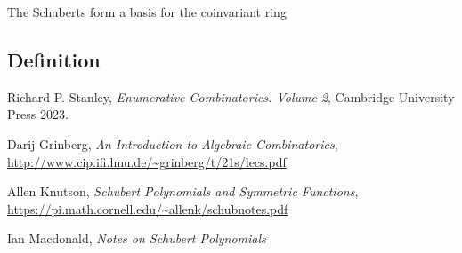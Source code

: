 \documentclass{article}
\begin{document}
\begin{theorem}
    The Schuberts form a basis for the coinvariant ring 
\end{theorem}
\subsection{Definition}



\begin{thebibliography}{999999999}
    \footnotesize \raggedright
    Richard P. Stanley, \textit{Enumerative Combinatorics. Volume 2}, Cambridge University Press 2023.

    Darij Grinberg, \textit{An Introduction to Algebraic Combinatorics}, \url{http://www.cip.ifi.lmu.de/~grinberg/t/21s/lecs.pdf}

    Allen Knutson, \textit{Schubert Polynomials and Symmetric Functions}, \url{https://pi.math.cornell.edu/~allenk/schubnotes.pdf}

    Ian Macdonald, \textit{Notes on Schubert Polynomials}
\end{thebibliography}
\end{document}
